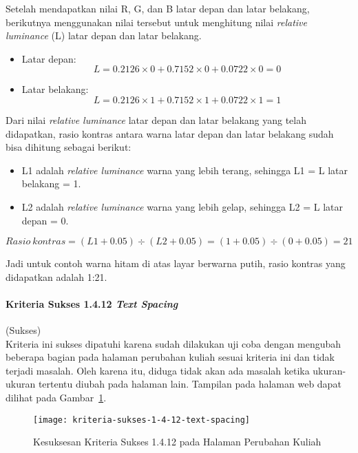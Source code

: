 Setelah mendapatkan nilai R, G, dan B latar depan dan latar belakang, berikutnya menggunakan nilai tersebut untuk menghitung nilai \textit{relative luminance} (L) latar depan dan latar belakang.

\begin{itemize}
	\item Latar depan:
		\[
			L = 0.2126 \times 0 + 0.7152 \times 0 + 0.0722 \times 0 = 0
		\]
	\item Latar belakang:
		\[
			L = 0.2126 \times 1 + 0.7152 \times 1 + 0.0722 \times 1 = 1
		\]
\end{itemize}

Dari nilai \textit{relative luminance} latar depan dan latar belakang yang telah didapatkan, rasio kontras antara warna latar depan dan latar belakang sudah bisa dihitung sebagai berikut:
\begin{itemize}
	\item L1 adalah \textit{relative luminance} warna yang lebih terang, sehingga L1 = L latar belakang = 1.
	\item L2 adalah \textit{relative luminance} warna yang lebih gelap, sehingga L2 = L latar depan = 0.
\end{itemize}
\[
	Rasio\ kontras = (L1 + 0.05) \div (L2 + 0.05) = (1 + 0.05) \div (0 + 0.05) = 21
\]

Jadi untuk contoh warna hitam di atas layar berwarna putih, rasio kontras yang didapatkan adalah 1:21.

\paragraph{Kriteria Sukses 1.4.12 \textit{Text Spacing}}
\label{par:kepatuhan_bluetape_kriteria_sukses_1.4.12}
(Sukses)\\

Kriteria ini sukses dipatuhi karena sudah dilakukan uji coba dengan mengubah beberapa bagian pada halaman perubahan kuliah sesuai kriteria ini dan tidak terjadi masalah. Oleh karena itu, diduga tidak akan ada masalah ketika ukuran-ukuran tertentu diubah pada halaman lain. Tampilan pada halaman web dapat dilihat pada \mbox{Gambar \ref{fig:1.4.12_text_spacing}}.

\begin{figure}[H]
    \centering  
    \texttt{[image: kriteria-sukses-1-4-12-text-spacing]}  
    \caption[Kesuksesan Kriteria Sukses 1.4.12 pada Halaman Perubahan Kuliah]{Kesuksesan Kriteria Sukses 1.4.12 pada Halaman Perubahan Kuliah}
    \label{fig:1.4.12_text_spacing}  
\end{figure} 

